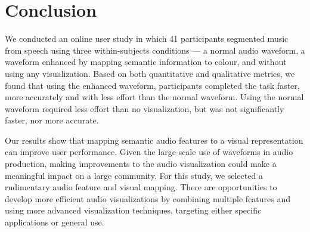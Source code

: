 \section{Conclusion}\label{sec:vis-conclusions}

We conducted an online user study in which 41 participants segmented music from speech using three within-subjects
conditions --- a normal audio waveform, a waveform enhanced by mapping semantic information to colour, and without using
any visualization.  Based on both quantitative and qualitative metrics, we found that using the enhanced waveform,
participants completed the task faster, more accurately and with less effort than the normal waveform. Using the normal
waveform required less effort than no visualization, but was not significantly faster, nor more accurate.

Our results show that mapping semantic audio features to a visual representation can improve user performance.  Given
the large-scale use of waveforms in audio production, making improvements to the audio visualization could make a
meaningful impact on a large community.  For this study, we selected a rudimentary audio feature and visual mapping.
There are opportunities to develop more efficient audio visualizations by combining multiple features and using more
advanced visualization techniques, targeting either specific applications or general use.



